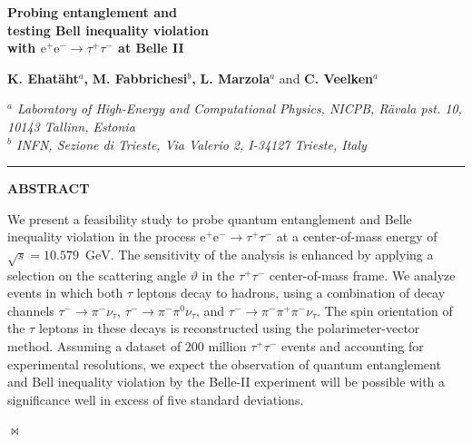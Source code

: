 \documentclass[a4paper,12pt,twocolumn]{article}
\numberwithin{equation}{section} %
\newcommand{\bc}{\begin{center}}
\newcommand{\ec}{\end{center}}
\newcommand{\Pem}{\ensuremath{\textrm{e}^{-}}\xspace}
\newcommand{\Pep}{\ensuremath{\textrm{e}^{+}}\xspace}
\newcommand{\Pgngt}{\ensuremath{\nu_{\tau}}\xspace}
\newcommand{\Pgpm}{\ensuremath{\pi^{-}}\xspace}
\newcommand{\Pgpp}{\ensuremath{\pi^{+}}\xspace}
\newcommand{\Pgpz}{\ensuremath{\pi^{\textrm{0}}}\xspace}
\newcommand{\Pgt}{\ensuremath{\tau}\xspace}
\newcommand{\Pgtm}{\ensuremath{\tau^{-}}\xspace}
\newcommand{\Pgtp}{\ensuremath{\tau^{+}}\xspace}
\newcommand{\GeV}{\ensuremath{\textrm{GeV}}\xspace}
\begin{document}
\onecolumn
\thispagestyle{empty}
\begin{center}
{ \Large \color{oucrimsonred} \textbf{ 
 Probing entanglement and \\[+1pt]
 testing Bell inequality violation\\[+6pt] with $\Pep\Pem \to \Pgtp\Pgtm$ at Belle II
}}

\vspace*{1.5cm}
{\bf K. Ehat\"aht$^{a}$,}
{\bf M. Fabbrichesi$^{b}$,}
{\bf L. Marzola$^{{a}}$}
and 
 {\bf C. Veelken$^{a}$}
 

\vspace{0.5cm}
{\small 
{\it \color{DarkGray}
$^{a}$ Laboratory of High-Energy and Computational Physics, NICPB, R\"avala pst. 10, \\ 10143 Tallinn, Estonia}
\\[1mm]
{\it  \color{DarkGray} $^{b}$
INFN, Sezione di Trieste, Via Valerio 2, I-34127 Trieste, Italy}
}
\end{center}

 \vskip0.5cm
\bc
{\color{DarkGray}
\rule{0.7\textwidth}{0.5pt}}
\ec
\vskip1cm
\bc
{\bf ABSTRACT}
\ec

\vspace*{5mm}

\noindent We present a feasibility study to probe quantum entanglement and Belle inequality violation in the process $\Pep\Pem \to \Pgtp\Pgtm$ at a center-of-mass energy of $\sqrt{s} = 10.579$~\GeV. The sensitivity of the analysis is enhanced by applying a selection on the scattering angle $\vartheta$ in the $\Pgtp\Pgtm$ center-of-mass  frame. We analyze events in which both $\Pgt$ leptons decay to hadrons, using a combination of decay channels $\Pgtm \to \Pgpm\Pgngt$, $\Pgtm \to \Pgpm\Pgpz\Pgngt$, and $\Pgtm \to \Pgpm\Pgpp\Pgpm\Pgngt$. The spin orientation of the $\Pgt$ leptons in these decays is reconstructed using the polarimeter-vector method. Assuming a dataset of $200$ million $\Pgtp\Pgtm$ events and accounting for experimental resolutions, we expect the observation of quantum entanglement and Bell inequality violation by the Belle-II experiment will be possible with a significance well in excess of five standard deviations.
  
  \vskip 3cm
\bc 
{\color{DarkGray} \vbox{$\bowtie$}}
\ec




\end{document}
